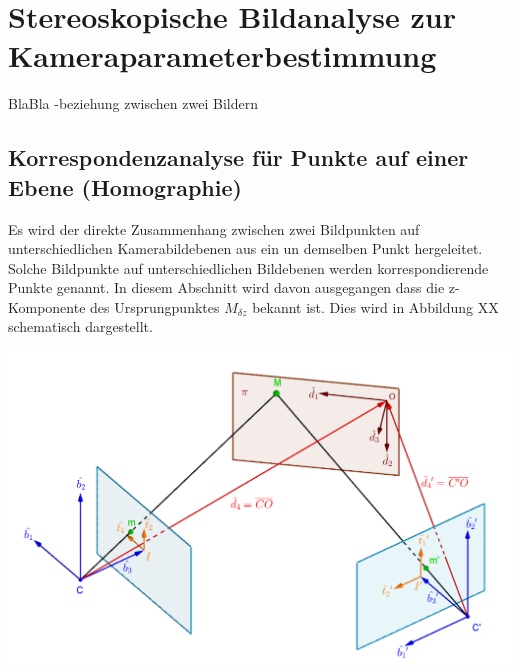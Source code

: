 \chapter{Stereoskopische Bildanalyse zur Kameraparameterbestimmung}
\label{sec:homographien} 
BlaBla -beziehung zwischen zwei Bildern

\section{Korrespondenzanalyse für Punkte auf einer Ebene (Homographie)}

Es wird der direkte Zusammenhang zwischen zwei Bildpunkten auf unterschiedlichen Kamerabildebenen aus ein un demselben Punkt hergeleitet. Solche Bildpunkte auf unterschiedlichen Bildebenen werden korrespondierende Punkte genannt. In diesem Abschnitt wird davon ausgegangen dass die z-Komponente des Ursprungpunktes $M_{\delta z}$ bekannt ist. Dies wird in Abbildung XX schematisch dargestellt.





\begin{minipage}{\linewidth}
	\centering
	\includegraphics[width=0.8\linewidth]{images/HomographieDP_beschriftet.png}
\end{minipage}\\

